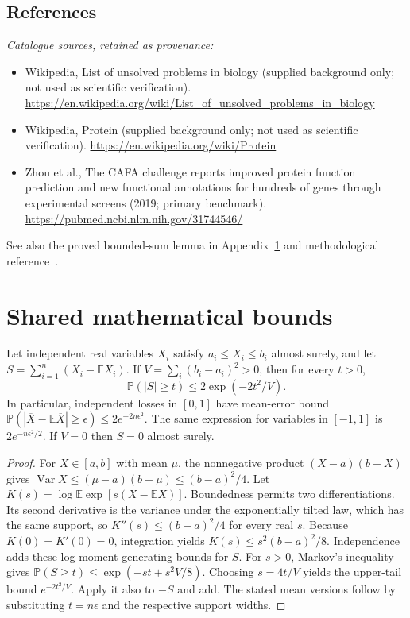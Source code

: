 \documentclass[11pt]{article}
\begin{document}
\subsection{References}
\noindent\emph{Catalogue sources, retained as provenance:}
\begin{itemize}
\item Wikipedia, List of unsolved problems in biology (supplied background only; not used as scientific verification). \url{https://en.wikipedia.org/wiki/List_of_unsolved_problems_in_biology}
\item Wikipedia, Protein (supplied background only; not used as scientific verification). \url{https://en.wikipedia.org/wiki/Protein}
\item Zhou et al., The CAFA challenge reports improved protein function prediction and new functional annotations for hundreds of genes through experimental screens (2019; primary benchmark). \url{https://pubmed.ncbi.nlm.nih.gov/31744546/}
\end{itemize}
\noindent See also the proved bounded-sum lemma in Appendix~\ref{app:bounds} and methodological reference~\cite{hoeffding}.




\section{Shared mathematical bounds}\label{app:bounds}
\begin{lemma}\label{lem:bounded}
Let independent real variables $X_i$ satisfy $a_i\leq X_i\leq b_i$ almost surely,
and let $S=\sum_{i=1}^n(X_i-\mathbb{E} X_i)$. If
$V=\sum_i(b_i-a_i)^2>0$, then for every $t>0$,
\[
 \mathbb{P}(|S|\geq t)\leq 2\exp(-2t^2/V).
\]
In particular, independent losses in $[0,1]$ have mean-error bound
$\mathbb{P}(|\overline X-\mathbb{E}\overline X|\geq\epsilon)
\leq2e^{-2n\epsilon^2}$. The same expression for variables in $[-1,1]$
is $2e^{-n\epsilon^2/2}$. If $V=0$ then $S=0$ almost surely.
\end{lemma}
\begin{proof}
For $X\in[a,b]$ with mean $\mu$, the nonnegative product
$(X-a)(b-X)$ gives
$\operatorname{Var} X\leq(\mu-a)(b-\mu)\leq(b-a)^2/4$.
Let $K(s)=\log\mathbb{E}\exp[s(X-\mathbb{E} X)]$.
Boundedness permits two differentiations. Its second derivative is the variance
under the exponentially tilted law, which has the same support, so
$K''(s)\leq(b-a)^2/4$ for every real $s$.
Because $K(0)=K'(0)=0$, integration yields
$K(s)\leq s^2(b-a)^2/8$.
Independence adds these log moment-generating bounds for $S$.
For $s>0$, Markov's inequality gives
$\mathbb{P}(S\geq t)\leq\exp(-st+s^2V/8)$.
Choosing $s=4t/V$ yields the upper-tail bound $e^{-2t^2/V}$.
Apply it also to $-S$ and add. The stated mean versions follow by substituting
$t=n\epsilon$ and the respective support widths.
\end{proof}
\end{document}

